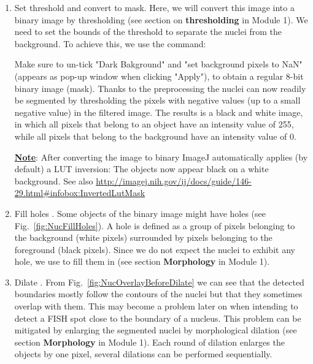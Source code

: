 \begin{enumerate}
    \item Set threshold and convert to mask. %
    Here, we will convert this image into a binary image by thresholding (see section on \textbf{thresholding} in Module 1). We need to set the bounds of the threshold to separate the nuclei from the background. To achieve this, we use the command:
   
    
    Make sure to un-tick "Dark Bakground" and "set background pixels to NaN" (appears as pop-up window when clicking "Apply"), to obtain a regular 8-bit binary image (mask). Thanks to the preprocessing the nuclei can now readily be segmented by thresholding the pixels with negative values (up to a small negative value) in the filtered image. 
    The results is a black and white image, in which all pixels that belong to an object have an intensity value of 255, while all pixels that belong to the background have an intensity value of 0. 
    
    \textbf{\underline{Note}}: After converting the image to binary ImageJ automatically applies (by default) a LUT inversion: The objects now appear black on a white background. See also  \url{http://imagej.nih.gov/ij/docs/guide/146-29.html#infobox:InvertedLutMask}
    

    \item Fill holes
    .
    Some objects of the binary image might have holes (see Fig.~\ref{fig:NucFillHoles}). A hole is defined as a group of pixels belonging to the background (white pixels) surrounded by pixels belonging to the foreground (black pixels). Since we do not expect the nuclei to exhibit any hole, we use  to fill them in (see section \textbf{Morphology} in Module 1).%
    
    
    \item Dilate
    .
    From Fig.~\ref{fig:NucOverlayBeforeDilate} we can see that the detected boundaries mostly follow the contours of the nuclei but that they sometimes overlap with them. This may become a problem later on when intending to detect a FISH spot close to the boundary of a nucleus. This problem can be mitigated by enlarging the segmented nuclei by morphological dilation (see section \textbf{Morphology} in Module 1). Each round of dilation enlarges the objects by one pixel, several dilations can be performed sequentially. %
    

\end{enumerate}
